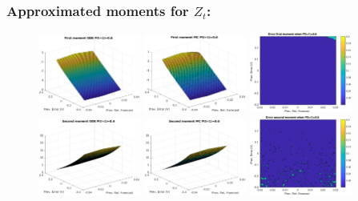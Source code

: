 \documentclass[aspectratio=169]{beamer}\usepackage[utf8]{inputenc}
\begin{document}
\begin{frame}\frametitle{Approximated moments for $Z_t$:}

\begin{figure}[ht!]
\centering
\includegraphics[width=0.3\textwidth]{../../MATLAB_Files/Results/moments/lamperti/errors/fm_ODE_5.eps}\quad
\includegraphics[width=0.3\textwidth]{../../MATLAB_Files/Results/moments/lamperti/errors/fm_MC_5.eps}\quad
\includegraphics[width=0.3\textwidth]{../../MATLAB_Files/Results/moments/lamperti/errors/fm_5.eps}\quad
\includegraphics[width=0.3\textwidth]{../../MATLAB_Files/Results/moments/lamperti/errors/sm_ODE_5.eps}\quad
\includegraphics[width=0.3\textwidth]{../../MATLAB_Files/Results/moments/lamperti/errors/sm_MC_5.eps}\quad
\includegraphics[width=0.3\textwidth]{../../MATLAB_Files/Results/moments/lamperti/errors/sm_5.eps}
\end{figure}

\end{frame}
\end{document}
